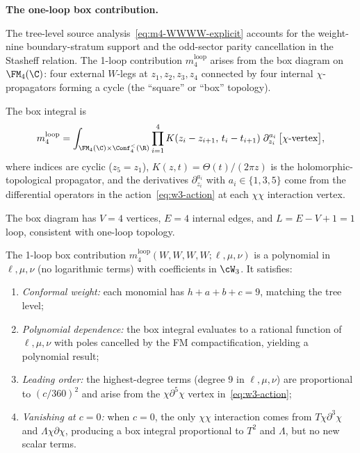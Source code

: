 \medskip
\noindent\textbf{The one-loop box contribution.}

\begin{construction}
\label{const:w3-m4-box}
The tree-level source analysis~\eqref{eq:m4-WWWW-explicit} accounts
for the weight-nine boundary-stratum support and the odd-sector
parity cancellation in the Stasheff relation. The 1-loop contribution
\(m_4^{\mathrm{loop}}\) arises from
the box diagram on $\FM_4(\C)$: four external $W$-legs at
$z_1, z_2, z_3, z_4$ connected by four internal $\chi$-propagators
forming a cycle (the ``square'' or ``box'' topology).

\smallskip
The box integral is
\begin{equation}
\label{eq:m4-box-integral}
m_4^{\mathrm{loop}}
= \int_{\FM_4(\C) \times \Conf_4^{<}(\R)}
\prod_{i=1}^{4}
K(z_i - z_{i+1},\, t_i - t_{i+1})\;
\partial_{z_i}^{a_i}\,\bigl[\text{$\chi$-vertex}\bigr],
\end{equation}
where indices are cyclic ($z_5 = z_1$),
$K(z,t) = \Theta(t)/(2\pi z)$ is the holomorphic-topological
propagator, and the derivatives $\partial_{z_i}^{a_i}$ with
$a_i \in \{1, 3, 5\}$ come from the differential operators in
the action~\eqref{eq:w3-action} at each $\chi\chi$ interaction vertex.

The box diagram has $V = 4$ vertices, $E = 4$ internal
edges, and $L = E - V + 1 = 1$ loop, consistent with
one-loop topology.
\end{construction}

\begin{proposition}
\label{prop:m4-box}
The 1-loop box contribution $m_4^{\mathrm{loop}}(W,W,W,W;\ell,\mu,\nu)$
is a polynomial in $\ell, \mu, \nu$ (no logarithmic terms) with
coefficients in $\cW_3$. It satisfies:
\begin{enumerate}
\item \emph{Conformal weight:} each monomial has
$h + a + b + c = 9$, matching the tree level;
\item \emph{Polynomial dependence:} the box integral evaluates to
a rational function of $\ell, \mu, \nu$ with poles cancelled by
the FM compactification, yielding a polynomial result;
\item \emph{Leading order:} the highest-degree terms (degree $9$
in $\ell,\mu,\nu$) are proportional to $(c/360)^2$ and arise
from the $\chi\partial^5\chi$ vertex in~\eqref{eq:w3-action};
\item \emph{Vanishing at $c = 0$:} when $c = 0$, the only
$\chi\chi$ interaction comes from $T\chi\partial^3\chi$
and $\Lambda\chi\partial\chi$, producing a box integral
proportional to $T^2$ and $\Lambda$, but no new scalar terms.
\end{enumerate}
\end{proposition}

